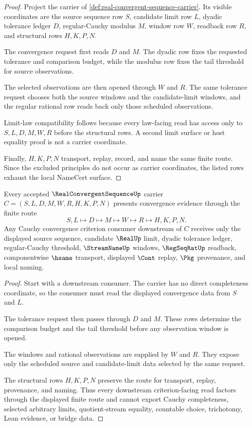 \begin{proof}
Project the carrier of \autoref{def:real-convergent-sequence-carrier}. Its visible coordinates are the source sequence row $S$, candidate limit row $L$, dyadic tolerance ledger $D$, regular-Cauchy modulus $M$, window row $W$, readback row $R$, and structural rows $H,K,P,N$.

The convergence request first reads $D$ and $M$. The dyadic row fixes the requested tolerance and comparison budget, while the modulus row fixes the tail threshold for source observations.

The selected observations are then opened through $W$ and $R$. The same tolerance request chooses both the source windows and the candidate-limit windows, and the regular rational row reads back only those scheduled observations.

Limit-law compatibility follows because every law-facing read has access only to $S,L,D,M,W,R$ before the structural rows. A second limit surface or host equality proof is not a carrier coordinate.

Finally, $H,K,P,N$ transport, replay, record, and name the same finite route. Since the excluded principles do not occur as carrier coordinates, the listed rows exhaust the local NameCert surface.
\end{proof}

\begin{theorem}\label{thm:real-convergent-sequence-l10-route}
Every accepted $\RealConvergentSequenceUp$ carrier $C=(S,L,D,M,W,R,H,K,P,N)$ presents convergence evidence through the finite route
$$
S,L \longmapsto D \longmapsto M \longmapsto W \longmapsto R \longmapsto H,K,P,N .
$$
Any Cauchy convergence criterion consumer downstream of $C$ receives only the displayed source sequence, candidate $\RealUp$ limit, dyadic tolerance ledger, regular-Cauchy threshold, $\StreamNameUp$ windows, $\RegSeqRatUp$ readback, componentwise $\hsame$ transport, displayed $\Cont$ replay, $\Pkg$ provenance, and local naming.
\end{theorem}
\begin{proof}
Start with a downstream consumer. The carrier has no direct completeness coordinate, so the consumer must read the displayed convergence data from $S$ and $L$.

The tolerance request then passes through $D$ and $M$. These rows determine the comparison budget and the tail threshold before any observation window is opened.

The windows and rational observations are supplied by $W$ and $R$. They expose only the scheduled source and candidate-limit data selected by the same request.

The structural rows $H,K,P,N$ preserve the route for transport, replay, provenance, and naming. Thus every downstream criterion-facing read factors through the displayed finite route and cannot export Cauchy completeness, selected arbitrary limits, quotient-stream equality, countable choice, trichotomy, Lean evidence, or bridge data.
\end{proof}

